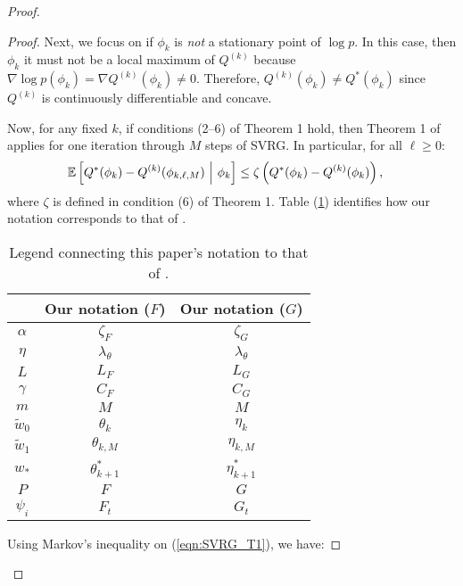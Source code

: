 \begin{proof}
\begin{proof}
Next, we focus on if $\phi_k$ is \textit{not} a stationary point of $\log p$. In this case, then $\phi_k$ it must not be a local maximum of $Q^{(k)}$ because $\nabla \log p(\phi_k) = \nabla Q^{(k)}(\phi_k) \neq 0$.
Therefore, $Q^{(k)}(\phi_{k}) \neq Q^{*}(\phi_{k})$ since $Q^{(k)}$ is continuously differentiable and concave. %

Now, for any fixed $k$, if conditions (2--6) of Theorem 1 hold, then Theorem 1 of \citet{Johnson:2013} applies for one iteration through $M$ steps of SVRG. In particular, for all $\ell \geq 0$:
%
\begin{align}
    \mathbb{E} & \left[Q^*(\phi_{k}) - Q^{(k)}(\phi_{k,\ell,M}) ~\Big\vert~ \phi_{k} \right] \leq \zeta \left( Q^*(\phi_{k}) - Q^{(k)}(\phi_k) \right), \label{eqn:SVRG_T1}
\end{align}
%
where $\zeta$ is defined in condition (6) of Theorem 1. Table (\ref{tbl:notation}) identifies how our notation corresponds to that of \citet{Johnson:2013}.
%
\begin{table}[]
\centering
\begin{tabular}{c|c|c}
\citet{Johnson:2013}                  & Our notation ($F$) & Our notation ($G$) \\ \hline
$\alpha$                              & $\zeta_F$     & $\zeta_G$       \\
$\eta$                                & $\lambda_\theta$   & $\lambda_\theta$   \\
$L$                                   & $L_F$              & $L_G$              \\
$\gamma$                              & $C_F$              & $C_G$              \\
$m$                                   & $M$                & $M$                \\
$\tilde{w}_0$                         & $\theta_k$         & $\eta_k$          \\
$\tilde{w}_1$                         & $\theta_{k,M}$     & $\eta_{k,M}$        \\
$w_{*}$                               & $\theta^*_{k+1}$   & $\eta^*_{k+1}$      \\
$P$                                   & $F$                & $G$                \\
$\psi_i$                              & $F_t$              & $G_t$             
\end{tabular}
\caption{Legend connecting this paper's notation to that of \citet{Johnson:2013}.}
\label{tbl:notation}
\end{table}
%
Using Markov's inequality on (\ref{eqn:SVRG_T1}), we have:


\end{proof}
\end{proof}
